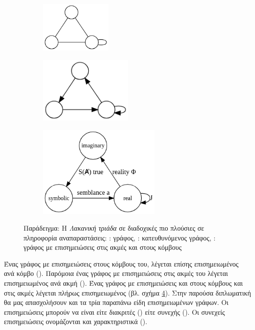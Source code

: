 \begin{figure}[ht]%
\centering
  \begin{subfigure}[α]{0.33\linewidth}
    \centering\includegraphics[width=100pt]{figures/lacan_a}
    \caption{\label{lac:a}}
  \end{subfigure}%
  \begin{subfigure}[β]{0.33\linewidth}
    \centering\includegraphics[width=130pt]{figures/lacan_b}
    \caption{\label{lac:b}}
  \end{subfigure}
  \begin{subfigure}[γ]{0.33\linewidth}
  \centering\includegraphics[width=170pt]{figures/lacan_c}
  \caption{\label{lac:c}}
  \end{subfigure}

  \caption[Παράδειγμα γράφου σε διαδοχικές πιο πλούσιες σε πληροφορία αναπαραστάσεις]{Παράδειγμα: H \textit{Λακανική τριάδα} σε διαδοχικές πιο πλούσιες σε πληροφορία αναπαραστάσεις: : γράφος, : κατευθυνόμενος γράφος, : γράφος με επισημειώσεις στις ακμές και στους κόμβους}
\label{lac}
\end{figure}

Ένας γράφος με επισημειώσεις στους κόμβους του, λέγεται επίσης επισημειωμένος ανά κόμβο ().
Παρόμοια ένας γράφος με επισημειώσεις στις ακμές του λέγεται επισημειωμένος ανά ακμή ().
Ένας γράφος με επισημειώσεις και στους κόμβους και στις ακμές λέγεται πλήρως επισημειωμένος (βλ. σχήμα \ref{lac}).
Στην παρούσα διπλωματική θα μας απασχολήσουν και τα τρία παραπάνω είδη επισημειωμένων γράφων.
Οι επισημειώσεις μπορούν να είναι είτε διακριτές () είτε συνεχής ().
Οι συνεχείς επισημειώσεις ονομάζονται και χαρακτηριστικά ().

